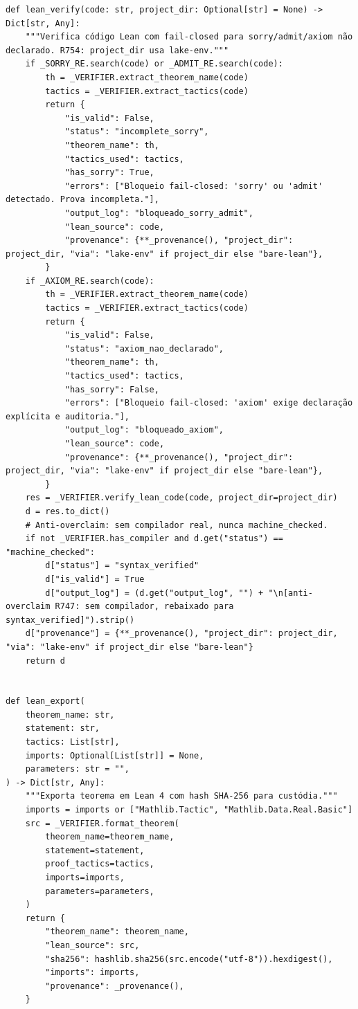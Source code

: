 \documentclass[12pt,openany,oneside,a4paper,brazil,chapter=TITLE]{abntex2}
\begin{document}
\begin{lstlisting}
def lean_verify(code: str, project_dir: Optional[str] = None) -> Dict[str, Any]:
    """Verifica código Lean com fail-closed para sorry/admit/axiom não declarado. R754: project_dir usa lake-env."""
    if _SORRY_RE.search(code) or _ADMIT_RE.search(code):
        th = _VERIFIER.extract_theorem_name(code)
        tactics = _VERIFIER.extract_tactics(code)
        return {
            "is_valid": False,
            "status": "incomplete_sorry",
            "theorem_name": th,
            "tactics_used": tactics,
            "has_sorry": True,
            "errors": ["Bloqueio fail-closed: 'sorry' ou 'admit' detectado. Prova incompleta."],
            "output_log": "bloqueado_sorry_admit",
            "lean_source": code,
            "provenance": {**_provenance(), "project_dir": project_dir, "via": "lake-env" if project_dir else "bare-lean"},
        }
    if _AXIOM_RE.search(code):
        th = _VERIFIER.extract_theorem_name(code)
        tactics = _VERIFIER.extract_tactics(code)
        return {
            "is_valid": False,
            "status": "axiom_nao_declarado",
            "theorem_name": th,
            "tactics_used": tactics,
            "has_sorry": False,
            "errors": ["Bloqueio fail-closed: 'axiom' exige declaração explícita e auditoria."],
            "output_log": "bloqueado_axiom",
            "lean_source": code,
            "provenance": {**_provenance(), "project_dir": project_dir, "via": "lake-env" if project_dir else "bare-lean"},
        }
    res = _VERIFIER.verify_lean_code(code, project_dir=project_dir)
    d = res.to_dict()
    # Anti-overclaim: sem compilador real, nunca machine_checked.
    if not _VERIFIER.has_compiler and d.get("status") == "machine_checked":
        d["status"] = "syntax_verified"
        d["is_valid"] = True
        d["output_log"] = (d.get("output_log", "") + "\n[anti-overclaim R747: sem compilador, rebaixado para syntax_verified]").strip()
    d["provenance"] = {**_provenance(), "project_dir": project_dir, "via": "lake-env" if project_dir else "bare-lean"}
    return d


def lean_export(
    theorem_name: str,
    statement: str,
    tactics: List[str],
    imports: Optional[List[str]] = None,
    parameters: str = "",
) -> Dict[str, Any]:
    """Exporta teorema em Lean 4 com hash SHA-256 para custódia."""
    imports = imports or ["Mathlib.Tactic", "Mathlib.Data.Real.Basic"]
    src = _VERIFIER.format_theorem(
        theorem_name=theorem_name,
        statement=statement,
        proof_tactics=tactics,
        imports=imports,
        parameters=parameters,
    )
    return {
        "theorem_name": theorem_name,
        "lean_source": src,
        "sha256": hashlib.sha256(src.encode("utf-8")).hexdigest(),
        "imports": imports,
        "provenance": _provenance(),
    }



\end{lstlisting}
\end{document}
